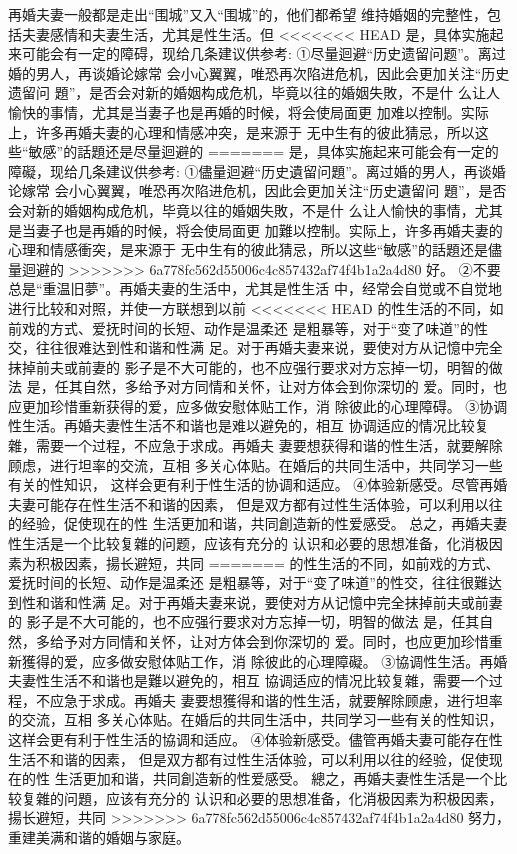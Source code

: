 \documentclass[12pt,UTF8]{ctexbook}
\begin{document}
再婚夫妻一般都是走出“围城”又入“围城”的，他们都希望
维持婚姻的完整性，包括夫妻感情和夫妻生活，尤其是性生活。但
<<<<<<< HEAD
是，具体实施起来可能会有一定的障碍，现给几条建议供参考:
①尽量迴避“历史遗留问题”。离过婚的男人，再谈婚论嫁常
会小心翼翼，唯恐再次陷进危机，因此会更加关注“历史遗留问
題”，是否会对新的婚姻构成危机，毕竟以往的婚姻失敗，不是什
么让人愉快的事情，尤其是当妻子也是再婚的时候，将会使局面更
加难以控制。实际上，许多再婚夫妻的心理和情感冲突，是来源于
无中生有的彼此猜忌，所以这些“敏感”的話題还是尽量迴避的
=======
是，具体实施起来可能会有一定的障礙，现给几条建议供参考:
①儘量迴避“历史遺留问題”。离过婚的男人，再谈婚论嫁常
会小心翼翼，唯恐再次陷进危机，因此会更加关注“历史遺留问
題”，是否会对新的婚姻构成危机，毕竟以往的婚姻失敗，不是什
么让人愉快的事情，尤其是当妻子也是再婚的时候，将会使局面更
加難以控制。实际上，许多再婚夫妻的心理和情感衝突，是来源于
无中生有的彼此猜忌，所以这些“敏感”的話題还是儘量迴避的
>>>>>>> 6a778fc562d55006c4c857432af74f4b1a2a4d80
好。
②不要总是“重温旧夢”。再婚夫妻的生活中，尤其是性生活
中，经常会自觉或不自觉地进行比较和对照，并使一方联想到以前
<<<<<<< HEAD
的性生活的不同，如前戏的方式、爱抚时间的长短、动作是温柔还
是粗暴等，对于“变了味道”的性交，往往很难达到性和谐和性满
足。对于再婚夫妻来说，要使对方从记憶中完全抹掉前夫或前妻的
影子是不大可能的，也不应强行要求对方忘掉一切，明智的做法
是，任其自然，多给予对方同情和关怀，让对方体会到你深切的
爱。同时，也应更加珍惜重新获得的爱，应多做安慰体贴工作，消
除彼此的心理障碍。
③协调性生活。再婚夫妻性生活不和谐也是难以避免的，相互
协调适应的情况比较复雜，需要一个过程，不应急于求成。再婚夫
妻要想获得和谐的性生活，就要解除顾虑，进行坦率的交流，互相
多关心体贴。在婚后的共同生活中，共同学习一些有关的性知识，
这样会更有利于性生活的协调和适应。
④体验新感受。尽管再婚夫妻可能存在性生活不和谐的因素，
但是双方都有过性生活体验，可以利用以往的经验，促使现在的性
生活更加和谐，共同創造新的性爱感受。
总之，再婚夫妻性生活是一个比较复雜的问题，应该有充分的
认识和必要的思想准备，化消极因素为积极因素，揚长避短，共同
=======
的性生活的不同，如前戏的方式、爱抚时间的长短、动作是温柔还
是粗暴等，对于“变了味道”的性交，往往很難达到性和谐和性满
足。对于再婚夫妻来说，要使对方从记憶中完全抹掉前夫或前妻的
影子是不大可能的，也不应强行要求对方忘掉一切，明智的做法
是，任其自然，多给予对方同情和关怀，让对方体会到你深切的
爱。同时，也应更加珍惜重新獲得的爱，应多做安慰体贴工作，消
除彼此的心理障礙。
③協调性生活。再婚夫妻性生活不和谐也是難以避免的，相互
協调适应的情况比较复雜，需要一个过程，不应急于求成。再婚夫
妻要想獲得和谐的性生活，就要解除顾慮，进行坦率的交流，互相
多关心体贴。在婚后的共同生活中，共同学习一些有关的性知识，
这样会更有利于性生活的協调和适应。
④体验新感受。儘管再婚夫妻可能存在性生活不和谐的因素，
但是双方都有过性生活体验，可以利用以往的经验，促使现在的性
生活更加和谐，共同創造新的性爱感受。
總之，再婚夫妻性生活是一个比较复雜的问題，应该有充分的
认识和必要的思想准备，化消极因素为积极因素，揚长避短，共同
>>>>>>> 6a778fc562d55006c4c857432af74f4b1a2a4d80
努力，重建美满和谐的婚姻与家庭。
\end{document}
